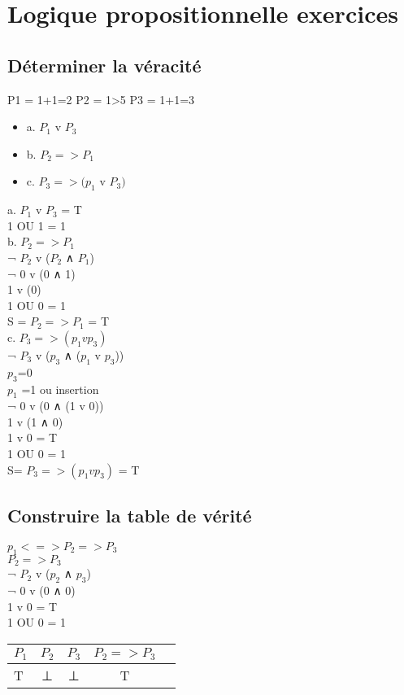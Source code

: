 \newpage

\section{Logique propositionnelle exercices}
\vspace{5mm} %

\subsection{Déterminer la véracité}
\vspace{5mm} %

P1 = 1+1=2  P2 = 1>5  P3 = 1+1=3

\begin{itemize}
\item {a. $P_1$ v $P_3$}
\item {b. $P_2 => P_1$}
\item {c. $P_3 => (p_1$ v $P_3)$}
\end{itemize}

a. $P_1$ v $P_3$ = T \\
1 OU 1 = 1\\

b. $P_2 => P_1$ \\
¬ $P_2$ v ($P_2$ ∧ $P_1$) \\
¬ 0 v (0 ∧ 1) \\
1 v (0) \\
1 OU 0 = 1\\
S = $P_2 => P_1$ = T \\

c. $P_3 => (p_1 v p_3)$ \\
¬ $P_3$ v ($p_3$ ∧ ($p_1$ v $p_3$)) \\
$p_3$=0 \\
$p_1$ =1 ou insertion \\
¬ 0 v (0 ∧ (1 v 0)) \\
1 v (1 ∧ 0) \\
1 v 0 = T \\
1 OU 0 = 1 \\
S= $P_3 => (p_1 v p_3)$ = T\\

\subsection{Construire la table de vérité}
\vspace{5mm} %
$p_1 <=> P_2 => P_3$ \\

$P_2 => P_3$ \\
¬ $P_2$ v ($p_2$ ∧ $p_3$) \\
¬ 0 v (0 ∧ 0) \\
1 v 0 = T \\
1 OU 0 = 1 \\

\begin{tabular}{|l|c|c|c|c|}
  \hline
  $P_1$ & $P_2$ & $P_3$ & $P_2 => P_3$ \\
  \hline
  T & ⊥ & ⊥ & T \\
  \hline
\end{tabular}
